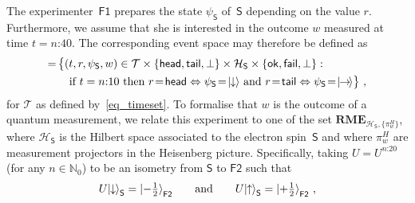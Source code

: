 \documentclass{article}
\theoremstyle{plain}
\theoremstyle{definition}
\newcommand*{\cH}{\mathcal{H}}
\newcommand*{\cT}{\mathcal{T}}
\newcommand*{\ket}[1]{{| #1 \rangle}}
\newcommand*{\Friendone}{\mathsf{F1}}
\newcommand*{\Friendtwo}{\mathsf{F2}}
\newcommand*{\Spin}{\mathsf{S}}
\newcommand*{\RME}{\mathbf{RME}}
\newcommand*{\spinup}{\ket{{\hspace{-0.1ex}\uparrow\hspace{-0.1ex}}}}
\newcommand*{\spindown}{\ket{{\hspace{-0.1ex}\downarrow\hspace{-0.1ex}}}}
\newcommand*{\spinright}{\ket{{\hspace{-0.2ex}\rightarrow\hspace{-0.4ex}}}}
\newcommand*{\sminus}{{\textstyle - \frac{1}{2}}}
\newcommand*{\splus}{{\textstyle + \frac{1}{2}}}
\newcommand*{\ok}{\mathsf{ok}}
\newcommand*{\fail}{\mathsf{fail}}
\newcommand*{\head}{\mathsf{head}}
\newcommand*{\tail}{\mathsf{tail}}
\begin{document}
The experimenter~$\Friendone$ prepares the state $\psi_\Spin$ of~$\Spin$ depending on the value $r$. Furthermore, we assume that she is interested in the outcome $w$ measured at time $t = \text{$n$:40}$. The corresponding event space may therefore be defined as
\begin{align}
  [\Friendone] = \,  &  \bigl\{(t, r, \psi_\Spin, w)   \in \cT \times \{\head,\tail,\bot\} \times \cH_{\Spin} \times \{\ok, \fail, \bot\} : \,  \nonumber 
  \\  & \quad  \text{if } t  = \text{$n$:10} \text{ then } r \! = \! \head \Leftrightarrow \psi_{\Spin}\! = \! \spindown \text{ and }  r\! =\! \tail \Leftrightarrow \psi_{\Spin} \! = \! \spinright \label{eq_Fonerpsi}
  \bigr\} \ ,
\end{align}
for $\cT$ as defined by~\eqref{eq_timeset}. 
To formalise that $w$ is the outcome of a quantum measurement, we relate this experiment to one of the set $\RME_{\cH_{\Spin}, \{\pi^H_w\}}$, where $\cH_{\Spin}$ is the Hilbert space associated to the electron spin~$\Spin$ and where $\pi^H_w$ are measurement projectors in the Heisenberg picture. Specifically, taking $U = U^{\text{$n$:20}}$ (for any $n \in \mathbb{N}_0$)  to be an isometry from $\Spin$ to $\Friendtwo$ such that
\begin{align*}
  U \spindown_{\Spin}  =  \ket{\sminus}_{\Friendtwo} \qquad \text{and} \qquad
  U\spinup_{\Spin}  = \ket{\splus}_{\Friendtwo}  \ ,
\end{align*}
\end{document}
